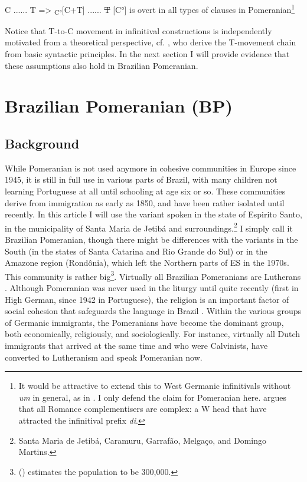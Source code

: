 \documentclass[output=paper,hidelinks,draftmode]{langscibook}
\begin{document}
\ea\label{ex:postma:4}
\ea\label{ex:postma:4a} C ...... T => \textsubscript{C°}[C+T] ...... \sout{T}
\ex\label{ex:postma:4b} {[C°]} {is} overt in all types of clauses in Pomeranian\footnote{It would be attractive to extend this to West Germanic infinitivals without \textit{um} in general, as in \citet{Bayer1984}. I only defend the claim for Pomeranian here. \citet{Kayne1999} argues that all Romance complementisers are complex: a W head that have attracted the infinitival prefix \textit{di}.} \z\z

Notice that T-to-C movement in infinitival constructions is independently motivated from a theoretical perspective, cf. \citet{Pesetsky2007}, who derive the T-movement chain from basic syntactic principles. In the next section I will provide evidence that these assumptions also hold in Brazilian Pomeranian.

\section{Brazilian Pomeranian (BP)}
\largerpage[2]
\subsection{Background}


While Pomeranian is not used anymore in cohesive communities in Europe since 1945, it is still in full use in various parts of Brazil, with many children not learning Portuguese at all until schooling at age six or so. These communities derive from immigration as early as 1850, and have been rather isolated until recently. In this article I will use the variant spoken in the state of Espirito Santo, in the municipality of Santa Maria de Jetibá and surroundings.\footnote{Santa Maria de Jetibá, Caramuru, Garrafão, Melgaço, and Domingo Martins.} I simply call it Brazilian Pomeranian, though there might be differences with the variants in the South (in the states of Santa Catarina and Rio Grande do Sul) or in the Amazone region (Rondônia), which left the Northern parts of ES in the 1970s. This community is rather big\footnote{\citeauthor{tressmann1998bilinguismo} (\citeyear{tressmann1998bilinguismo}) estimates the population to be 300,000.}. Virtually all Brazilian Pomeranians are Lutherans \citep{Droogers2008}. Although Pomeranian was never used in the liturgy until quite recently (first in High German, since 1942 in Portuguese), the religion is an important factor of social cohesion that safeguards the language in Brazil \citep{Schaffel2014}. Within the various groups of Germanic immigrants, the Pomeranians have become the dominant group, both economically, religiously, and sociologically. For instance, virtually all Dutch immigrants that arrived at the same time and who were Calvinists, have converted to Lutheranism and speak Pomeranian now. 
\end{document}
